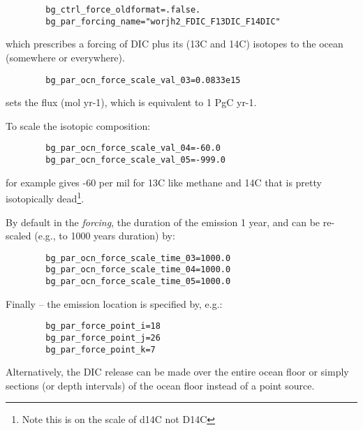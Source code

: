 \documentclass[10pt,twoside]{article}
\begin{document}
\begin{compactitem}

        \item
        \vspace{-5pt}\begin{verbatim}
        bg_ctrl_force_oldformat=.false.
        bg_par_forcing_name="worjh2_FDIC_F13DIC_F14DIC"
        \end{verbatim}\vspace{-5pt}
        which prescribes a forcing of DIC plus its (13C and 14C) isotopes to the ocean (somewhere or everywhere).
        \item
        \vspace{-5pt}\begin{verbatim}
        bg_par_ocn_force_scale_val_03=0.0833e15
        \end{verbatim}\vspace{-5pt}
        sets the flux (mol yr-1), which is equivalent to 1 PgC yr-1.
        \item To scale the isotopic composition:
        \vspace{-5pt}\begin{verbatim}
        bg_par_ocn_force_scale_val_04=-60.0
        bg_par_ocn_force_scale_val_05=-999.0
        \end{verbatim}\vspace{-5pt}
        for example gives -60 per mil for 13C like methane and 14C that is pretty isotopically dead\footnote{Note this is on the scale of d14C not D14C}.
        \item By default in the \textit{forcing}, the duration of the emission 1 year, and can be re-scaled (e.g., to 1000 years duration) by: 
        \vspace{-5pt}\begin{verbatim}
        bg_par_ocn_force_scale_time_03=1000.0
        bg_par_ocn_force_scale_time_04=1000.0
        bg_par_ocn_force_scale_time_05=1000.0
        \end{verbatim}\vspace{-5pt}
        \item Finally -- the emission location is specified by, e.g.:
        \vspace{-5pt}\begin{verbatim}
        bg_par_force_point_i=18
        bg_par_force_point_j=26
        bg_par_force_point_k=7
        \end{verbatim}\vspace{-5pt}
        Alternatively, the DIC release can be made over the entire ocean floor or simply sections (or depth intervals) of 
the ocean floor instead of a point source.

\end{compactitem}
\end{document}

